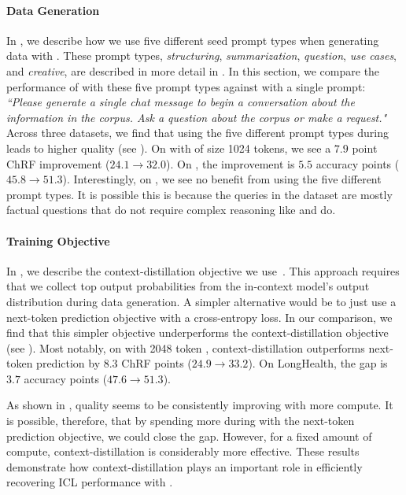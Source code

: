 \paragraph{Data Generation} In , we describe how we use five different seed prompt types when generating data with . These prompt types, \textit{structuring}, \textit{summarization}, \textit{question}, \textit{use cases}, and \textit{creative}, are described in more detail in .
In this section, we compare the performance of \method with these five prompt types against \method with a single prompt: \textit{``Please generate a single chat message to begin a conversation about the information in the corpus. Ask a question about the corpus or make a request."}
Across three datasets, we find that using the five different prompt types during \method leads to higher quality \artifacts (see ).
On \mtob with \artifacts of size 1024 tokens, we see a $7.9$ point ChRF improvement ($24.1 \rightarrow 32.0$).
On \longhealth, the improvement is $5.5$ accuracy points ($45.8 \rightarrow 51.3$).
Interestingly, on \qasper, we see no benefit from using the five different prompt types.
It is possible this is because the queries in the \qasper dataset are mostly factual questions that do not require complex reasoning like \longhealth and \mtob do.

\paragraph{Training Objective}
\label{app:obj}
In , we describe the context-distillation objective we use~\cite{snell2022learning,kim2016sequence,bhargava2024prompt}.
This approach requires that we collect top output probabilities from the in-context model's output distribution during data generation.
A simpler alternative would be to just use a next-token prediction objective with a cross-entropy loss.
In our comparison, we find that this simpler objective underperforms the context-distillation objective (see ).
Most notably, on \mtob with 2048 token \artifacts, context-distillation outperforms next-token prediction by $8.3$ ChRF points ($24.9 \rightarrow 33.2$).
On LongHealth, the gap is $3.7$ accuracy points ($47.6 \rightarrow 51.3$).

As shown in , quality seems to be consistently improving with more \method compute.
It is possible, therefore, that by spending more during \method with the next-token prediction objective, we could close the gap.
However, for a fixed amount of \method compute, context-distillation is considerably more effective.
These results demonstrate how context-distillation plays an important role in efficiently recovering ICL performance with \method.
